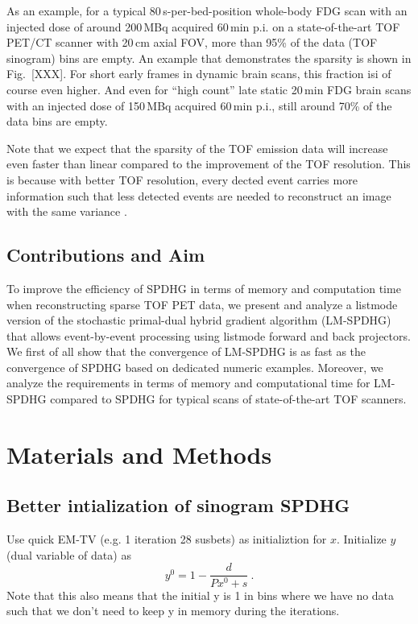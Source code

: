 As an example, for a typical 80\,s-per-bed-position whole-body FDG scan with an injected dose 
of around 200\,MBq acquired 60\,min p.i. on a state-of-the-art TOF PET/CT scanner with
20\,cm axial FOV, more than 95\% of the data (TOF sinogram) bins are empty.
An example that demonstrates the sparsity is shown in Fig.~[XXX].
For short early frames in dynamic brain scans, this fraction isi of course even higher.
And even for ``high count'' late static 20\,min FDG brain scans with an injected dose of 150\,MBq
acquired 60\,min p.i., still around 70\% of the data bins are empty.

Note that we expect that the sparsity of the TOF emission data will increase even faster than
linear compared to the improvement of the TOF resolution.
This is because with better TOF resolution, every dected event carries more information such
that less detected events are needed to reconstruct an image with the same variance \cite{Tomitani1981}.

\subsection*{Contributions and Aim}

To improve the efficiency of SPDHG in terms of memory and computation time when reconstructing 
sparse TOF PET data, we present and analyze a listmode version of the stochastic primal-dual 
hybrid gradient algorithm (LM-SPDHG) that allows event-by-event processing using 
listmode forward and back projectors.
We first of all show that the convergence of LM-SPDHG is as fast as the convergence of SPDHG
based on dedicated numeric examples.
Moreover, we analyze the requirements in terms of memory and computational time
for LM-SPDHG compared to SPDHG for typical scans of state-of-the-art TOF scanners.


\section{Materials and Methods}

\subsection{Better intialization of sinogram SPDHG}

Use quick EM-TV (e.g. 1 iteration 28 susbets) as initializtion for $x$.
Initialize $y$ (dual variable of data) as
\begin{equation}
y^0 = 1 - \frac{d}{Px^0 + s} \ .
\end{equation}
Note that this also means that the initial y is 1 in bins where we have
no data such that we don't need to keep y in memory during the iterations.

